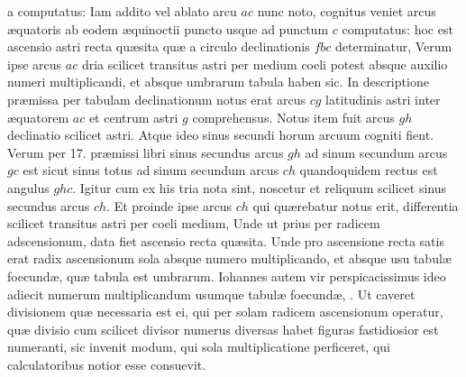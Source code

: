 \documentclass[11pt,a4paper]{article}
\begin{document}
a computatus: Iam addito vel ablato arcu $ac$ nunc noto,
cognitus veniet arcus æquatoris ab eodem æquinoctii puncto
usque ad punctum $c$ computatus: hoc est ascensio astri recta quæsita
quæ a circulo declinationis $fbc$ determinatur, Verum ipse arcus
$ac$ dria scilicet transitus astri per medium coeli potest absque
auxilio numeri multiplicandi, et absque umbrarum tabula haben
sic. In descriptione præmissa per tabulam declinationum notus
erat arcus $cg$ latitudinis astri inter æquatorem $ac$ et centrum astri
$g$ comprehensus. Notus item fuit arcus $gh$ declinatio scilicet astri.
Atque ideo sinus secundi horum arcuum cogniti fient. Verum per
17. præmissi libri sinus secundus arcus $gh$ ad sinum secundum
arcus $gc$ est sicut sinus totus ad sinum secundum arcus $ch$
quandoquidem rectus est angulus $ghc$. Igitur cum ex his tria
nota sint, noscetur et reliquum scilicet sinus secundus arcus
$ch$. Et proinde ipse arcus $ch$ qui quærebatur notus erit, differentia
scilicet transitus astri per coeli medium, Unde ut prius per
radicem adscensionum, data fiet ascensio recta quæsita. Unde
pro ascensione recta satis erat radix ascensionum sola absque
numero multiplicando, et absque usu tabulæ foecundæ, quæ
tabula est umbrarum. Iohannes autem vir perspicacissimus
ideo adiecit numerum multiplicandum usumque tabulæ foecundæ,
. Ut caveret divisionem quæ
necessaria est ei, qui per solam radicem ascensionum operatur,
quæ divisio cum scilicet divisor numerus diversas habet figuras
fastidiosior est numeranti, sic invenit modum, qui sola multiplicatione
perficeret, qui calculatoribus notior esse consuevit.
\end{document}
